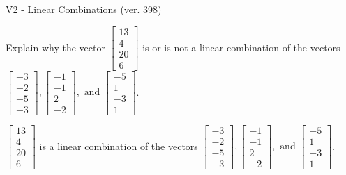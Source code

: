 \begin{exercise}
  \begin{exerciseTitle}V2 - Linear Combinations (ver. 398)\end{exerciseTitle}
  \begin{exerciseStatement}
    Explain why the vector \(\left[\begin{array}{c}
13 \\
4 \\
20 \\
6
\end{array}\right]\)  is or is not a linear 
	combination of the vectors \(\left[\begin{array}{c}
-3 \\
-2 \\
-5 \\
-3
\end{array}\right] , \left[\begin{array}{c}
-1 \\
-1 \\
2 \\
-2
\end{array}\right] , \text{ and } \left[\begin{array}{c}
-5 \\
1 \\
-3 \\
1
\end{array}\right]\).
	


  \end{exerciseStatement}
  \begin{exerciseAnswer}
   \(\left[\begin{array}{c}
13 \\
4 \\
20 \\
6
\end{array}\right]\) 
  	 is  
	a linear combination of the vectors \(\left[\begin{array}{c}
-3 \\
-2 \\
-5 \\
-3
\end{array}\right] , \left[\begin{array}{c}
-1 \\
-1 \\
2 \\
-2
\end{array}\right] , \text{ and } \left[\begin{array}{c}
-5 \\
1 \\
-3 \\
1
\end{array}\right]\).

	
  


  \end{exerciseAnswer}
\end{exercise}